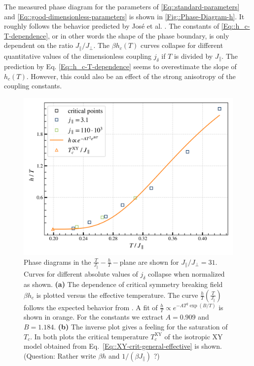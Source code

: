 	The measured phase diagram for the parameters of \eqref{Eq::standard-parameters} and \eqref{Eq::good-dimensionless-parameters} is shown in \autoref{Fig::Phase-Diagram-h}. It roughly follows the behavior predicted by José et al. \cite{jose1977renormalization}. The constants of \eqref{Eq::h_c-T-dependence}, or in other words the shape of the phase boundary, is only dependent on the ratio $J_\parallel /	J_\perp$. The $\beta h_c(T)$ curves collapse for different quantitative values of the dimensionless coupling $j_\delta$ if $T$ is divided by $J_\parallel$. The prediction by Eq. \eqref{Eq::h_c-T-dependence} seems to overestimate the slope of $h_c(T)$. However, this could also be an effect of the strong anisotropy of the coupling constants.	
	\begin{figure}[htp]
		\centering
		\includegraphics[width=0.9\linewidth]{graphics/phase_transition-h(T).png}
		\caption{Phase diagrams in the $\tfrac{T}{J_\parallel} - \tfrac{h}{T}-$plane are shown for $J_\parallel /	J_\perp =	31$. Curves for different absolute values of $j_\delta$ collapse when normalized as shown.  \textbf{(a)} The dependence  of critical symmetry breaking field $\beta h_c$ is plotted versus the effective temperature. The curve $\tfrac{h}{T} \left(\tfrac{T}{J_\parallel}\right)$ follows the expected behavior from \cite{jose1977renormalization}. A fit of $\tfrac{h}{T} \propto e^{-AT^2 \exp({B/T})}$ is shown in orange. For the constants we extract $A=0.909$ and $B=1.184$. \textbf{(b)} The inverse plot gives a feeling for the saturation of $T_c$. In both plots the critical temperature $T_c^{\text{XY}}$ of the isotropic XY model obtained from Eq.~\eqref{Eq::XY-crit-general-effective} is shown. (Question: Rather write $\beta h$ and $1 /	(\beta J_\parallel)$ ?)}
		\label{Fig::Phase-Diagram-h}
	\end{figure}
